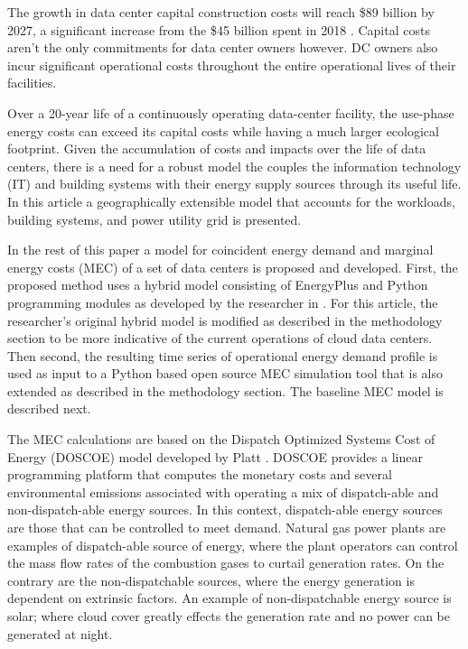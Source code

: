 The growth in data center capital construction costs will reach \$89 billion by 2027, a significant increase from the \$45 billion spent in 2018 \citep{dcmarket19}. Capital costs aren’t the only commitments for data center owners however. DC owner\textsc{}s also incur significant operational costs throughout the entire operational lives of their facilities.  

Over a 20-year life of a continuously operating data-center facility, the use-phase energy costs can exceed its capital costs while having a much larger ecological footprint. Given the accumulation of costs and impacts over the life of data centers, there is a need for a robust model the couples the information technology (IT) and building systems with their energy supply sources through its useful life. In this article a geographically extensible model that accounts for the workloads, building systems, and power utility grid is presented.

In the rest of this paper a model for coincident energy demand and marginal energy costs (MEC) of a set of data centers is proposed and developed. First, the proposed method uses a hybrid model consisting of EnergyPlus and Python programming modules as developed by the researcher in \citep{kumar20}. For this article, the researcher's original hybrid model is modified as described in the methodology section to be more indicative of the current operations of cloud data centers. Then second, the resulting time series of operational energy demand profile is used as input to a Python based open source MEC simulation tool that is also extended as described in the methodology section. The baseline MEC model is described next. 

The MEC calculations are based on the Dispatch Optimized Systems Cost of Energy (DOSCOE) model developed by Platt \citep{platt17}. DOSCOE provides a linear programming platform that computes the monetary costs and several environmental emissions associated with operating a mix of dispatch-able and non-dispatch-able energy sources. In this context, dispatch-able energy sources are those that can be controlled to meet demand. Natural gas power plants are examples of dispatch-able source of energy, where the plant operators can control the mass flow rates of the combustion gases to curtail generation rates. On the contrary are the non-dispatchable sources, where the energy generation is dependent on extrinsic factors. An example of non-dispatchable energy source is solar; where cloud cover greatly effects the generation rate and no power can be generated at night.

